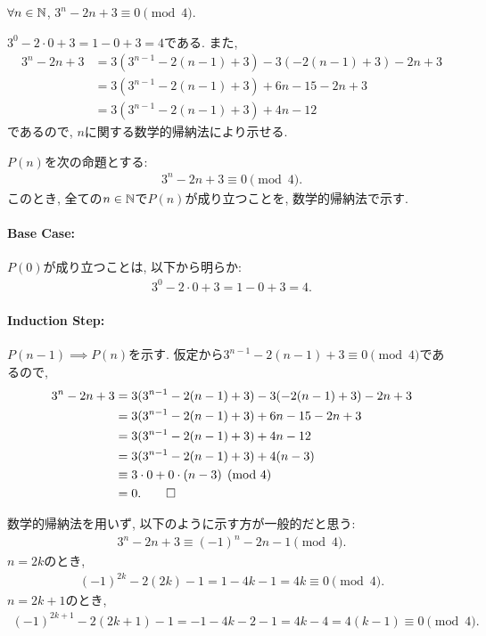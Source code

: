 \begin{prop}
  \label{p:20230804}
  $\forall n\in\mathbb{N}$,
  $3^{n}-2n+3\equiv 0\pmod{4}$.
\end{prop}

\begin{proof**}
  $3^{0}-2\cdot 0+3=1-0+3=4$である.
  また,
  \begin{align*}
    3^{n}-2n+3
    &=3(3^{n-1}-2(n-1)+3)-3(-2(n-1)+3)-2n+3\\
    &=3(3^{n-1}-2(n-1)+3)+6n-15-2n+3\\
    &=3(3^{n-1}-2(n-1)+3)+4n-12
  \end{align*}
  であるので,
  $n$に関する数学的帰納法により示せる.
\end{proof**}

\begin{proof*}
  $P(n)$を次の命題とする:
  \begin{align*}
    3^{n}-2n+3\equiv 0\pmod{4}
    .
  \end{align*}
  このとき,
  全ての$n\in\mathbb{N}$で$P(n)$が成り立つことを,
  数学的帰納法で示す.

  \paragraph{Base Case:}
  $P(0)$が成り立つことは, 以下から明らか:
  \begin{align*}
    3^{0}-2\cdot 0+3=1-0+3=4.
  \end{align*}

  \paragraph{Induction Step:}
  $P(n-1)\implies P(n)$を示す.
  仮定から$3^{n-1}-2(n-1)+3\equiv 0\pmod{4}$であるので,
  \begin{align*}
    3^{n}-2n+3
    &=3(3^{n-1}-2(n-1)+3)-3(-2(n-1)+3)-2n+3\\
    &=3(3^{n-1}-2(n-1)+3)+6n-15-2n+3\\
    &=3(3^{n-1}-2(n-1)+3)+4n-12\\
    &=3(3^{n-1}-2(n-1)+3)+4(n-3)\\
    &\equiv 3\cdot 0+0\cdot(n-3)\pmod{4}\\
    &=0
    .\qedhere
  \end{align*}
\end{proof*}

\begin{rem}
  数学的帰納法を用いず, 以下のように示す方が一般的だと思う:
  \begin{align*}
    3^{n}-2n+3\equiv (-1)^n-2n-1\pmod{4}.
  \end{align*}
  $n=2k$のとき,
  \begin{align*}
    (-1)^{2k}-2(2k)-1=1-4k-1=4k\equiv 0 \pmod{4}.
  \end{align*}
  $n=2k+1$のとき,
  \begin{align*}
    (-1)^{2k+1}-2(2k+1)-1=-1-4k-2-1=4k-4=4(k-1)\equiv 0 \pmod{4}.
  \end{align*} 
\end{rem}

